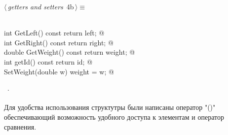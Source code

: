 \documentclass[12pt]{article}
\begin{document}
\begin{flushleft} \small
\begin{minipage}{\linewidth}\label{scrap3}\raggedright\small
{} $\langle\,${\itshape getters and setters}\nobreak\ {\footnotesize {4b}}$\,\rangle\equiv$
\vspace{-1ex}
\begin{list}{}{} \item
\mbox{}\verb@@\\
\mbox{}\verb@const int GetLeft() const { return left; }@\\
\mbox{}\verb@const int GetRight() const { return right; }@\\
\mbox{}\verb@const double GetWeight() const { return weight; }@\\
\mbox{}\verb@const int getId() const { return id; }@\\
\mbox{}\verb@void SetWeight(double w) { weight = w; }@\\
\mbox{}\verb@@{\NWsep}
\end{list}
\vspace{-1.5ex}
\footnotesize
\begin{list}{}{\setlength{\itemsep}{-\parsep}\setlength{\itemindent}{-\leftmargin}}
\item \NWtxtMacroRefIn\ .

\item{}
\end{list}
\end{minipage}\vspace{4ex}
\end{flushleft}
\paragraph{}
Для удобства использования структутры были написаны оператор "()" 
обеспечивающий возможность удобного доступа к элементам и оператор сравнения.
\end{document}
